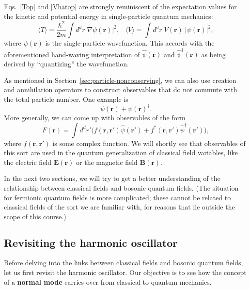 \documentclass[prx,12pt]{revtex4-2}
\begin{document}
Eqs.~\eqref{Top} and \eqref{Vhatop} are strongly reminiscent of the
expectation values for the kinetic and potential energy in
single-particle quantum mechanics:
\begin{equation}
  \langle T\rangle = \frac{\hbar^2}{2m} \int d^d r \left|\nabla\psi(\mathbf{r})\right|^2, \;\;\; \langle V\rangle = \int d^dr \; V(\mathbf{r}) \; |\psi(\mathbf{r})|^2,
\end{equation}
where $\psi(\mathbf{r})$ is the single-particle wavefunction.  This
accords with the aforementioned hand-waving interpretation of
$\hat{\psi}(\mathbf{r})$ and $\hat{\psi}^\dagger(\mathbf{r})$ as being
derived by ``quantizing'' the wavefunction.

As mentioned in Section~\ref{sec:particle-nonconserving}, we can also
use creation and annihilation operators to construct observables that
do not commute with the total particle number.  One example is
\begin{equation*}
  \psi(\mathbf{r}) + \psi(\mathbf{r})^\dagger.
\end{equation*}
More generally, we can come up with observables of the form
\begin{equation}
  F(\mathbf{r}) = \int d^dr' \Big(f(\mathbf{r},\mathbf{r}') \hat{\psi}(\mathbf{r}') + f^*(\mathbf{r},\mathbf{r}') \hat{\psi}^\dagger(\mathbf{r}') \Big),
  \label{fieldop}
\end{equation}
where $f(\mathbf{r},\mathbf{r}')$ is some complex function.  We will
shortly see that observables of this sort are used in the quantum
generalization of classical field variables, like the electric field
$\mathbf{E}(\mathbf{r})$ or the magnetic field
$\mathbf{B}(\mathbf{r})$.

In the next two sections, we will try to get a better understanding of
the relationship between classical fields and bosonic quantum fields.
(The situation for fermionic quantum fields is more complicated; these
cannot be related to classical fields of the sort we are familiar
with, for reasons that lie outside the scope of this course.)

\subsection{Revisiting the harmonic oscillator}
\label{sec:ho}

Before delving into the links between classical fields and bosonic
quantum fields, let us first revisit the harmonic oscillator.  Our
objective is to see how the concept of a \textbf{normal mode} carries
over from classical to quantum mechanics.
\end{document}
